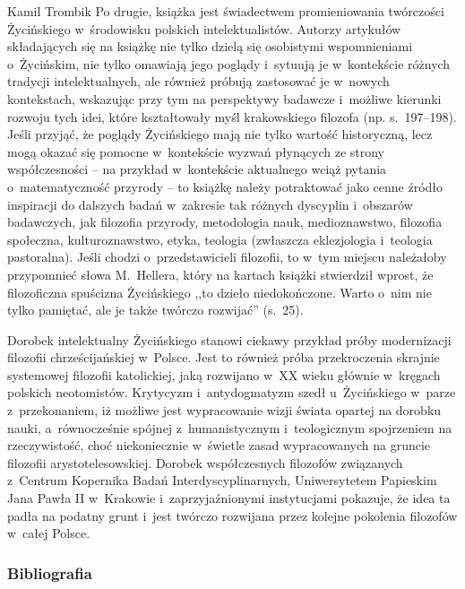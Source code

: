 \begin{recplenv}{Kamil Trombik}
Po drugie, książka jest świadectwem promieniowania twórczości Życińskiego w~środowisku polskich intelektualistów. Autorzy artykułów składających się na książkę nie tylko dzielą się osobistymi wspomnieniami o~Życińskim, nie tylko omawiają jego poglądy i~sytuują je w~kontekście różnych tradycji intelektualnych, ale również próbują zastosować je w~nowych kontekstach, wskazując przy tym na perspektywy badawcze i~możliwe kierunki rozwoju tych idei, które kształtowały myśl krakowskiego filozofa (np. s.~197–198). Jeśli przyjąć, że poglądy Życińskiego mają nie tylko wartość historyczną, lecz mogą okazać się pomocne w~kontekście wyzwań płynących ze strony współczesności -- na przykład w~kontekście aktualnego wciąż pytania o~matematyczność przyrody -- to książkę należy potraktować jako cenne źródło inspiracji do dalszych badań w~zakresie tak różnych dyscyplin i~obszarów badawczych, jak filozofia przyrody, metodologia nauk, medioznawstwo, filozofia społeczna, kulturoznawstwo, etyka, teologia (zwłaszcza eklezjologia i~teologia pastoralna). Jeśli chodzi o~przedstawicieli filozofii, to w~tym miejscu należałoby przypomnieć słowa M.~Hellera, który na kartach książki stwierdził wprost, że filozoficzna spuścizna Życińskiego ,,to dzieło niedokończone. Warto o~nim nie tylko pamiętać, ale je także twórczo rozwijać'' (s.~25).

Dorobek intelektualny Życińskiego stanowi ciekawy przykład próby modernizacji filozofii chrześcijańskiej w~Polsce. Jest to również próba przekroczenia skrajnie systemowej filozofii katolickiej, jaką rozwijano w~XX wieku głównie w~kręgach polskich neotomistów. Krytycyzm i~antydogmatyzm szedł u~Życińskiego w~parze z~przekonaniem, iż możliwe jest wypracowanie wizji świata opartej na dorobku nauki, a~równocześnie spójnej z~humanistycznym i~teologicznym spojrzeniem na rzeczywistość, choć niekoniecznie w~świetle zasad wypracowanych na gruncie filozofii arystotelesowskiej. Dorobek współczesnych filozofów związanych z~Centrum Kopernika Badań Interdyscyplinarnych, Uniwersytetem Papieskim Jana Pawła II w~Krakowie i~zaprzyjaźnionymi instytucjami pokazuje, że idea ta padła na podatny grunt i~jest twórczo rozwijana przez kolejne pokolenia filozofów w~całej Polsce.





\subsubsection{Bibliografia}\nopagebreak[4]
\end{recplenv}